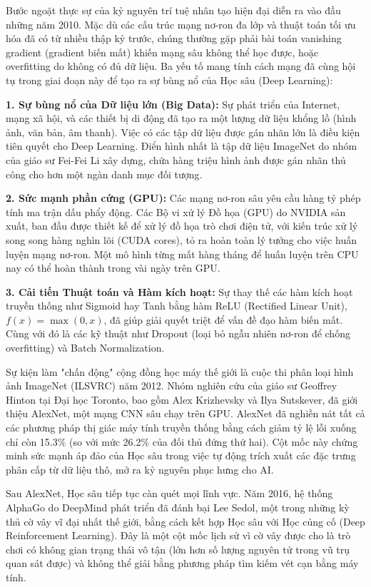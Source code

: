Bước ngoặt thực sự của kỷ nguyên trí tuệ nhân tạo hiện đại diễn ra vào đầu những năm 2010. Mặc dù các cấu trúc mạng nơ-ron đa lớp và thuật toán tối ưu hóa đã có từ nhiều thập kỷ trước, chúng thường gặp phải bài toán vanishing gradient (gradient biến mất) khiến mạng sâu không thể học được, hoặc overfitting do không có đủ dữ liệu. Ba yếu tố mang tính cách mạng đã cùng hội tụ trong giai đoạn này để tạo ra sự bùng nổ của Học sâu (Deep Learning):

\textbf{1. Sự bùng nổ của Dữ liệu lớn (Big Data):} Sự phát triển của Internet, mạng xã hội, và các thiết bị di động đã tạo ra một lượng dữ liệu khổng lồ (hình ảnh, văn bản, âm thanh). Việc có các tập dữ liệu được gán nhãn lớn là điều kiện tiên quyết cho Deep Learning. Điển hình nhất là tập dữ liệu ImageNet do nhóm của giáo sư Fei-Fei Li xây dựng, chứa hàng triệu hình ảnh được gán nhãn thủ công cho hơn một ngàn danh mục đối tượng.

\textbf{2. Sức mạnh phần cứng (GPU):} Các mạng nơ-ron sâu yêu cầu hàng tỷ phép tính ma trận dấu phẩy động. Các Bộ vi xử lý Đồ họa (GPU) do NVIDIA sản xuất, ban đầu được thiết kế để xử lý đồ họa trò chơi điện tử, với kiến trúc xử lý song song hàng nghìn lõi (CUDA cores), tỏ ra hoàn toàn lý tưởng cho việc huấn luyện mạng nơ-ron. Một mô hình từng mất hàng tháng để huấn luyện trên CPU nay có thể hoàn thành trong vài ngày trên GPU.

\textbf{3. Cải tiến Thuật toán và Hàm kích hoạt:} Sự thay thế các hàm kích hoạt truyền thống như Sigmoid hay Tanh bằng hàm ReLU (Rectified Linear Unit), $f(x) = \max(0, x)$, đã giúp giải quyết triệt để vấn đề đạo hàm biến mất. Cùng với đó là các kỹ thuật như Dropout (loại bỏ ngẫu nhiên nơ-ron để chống overfitting) và Batch Normalization.

Sự kiện làm "chấn động" cộng đồng học máy thế giới là cuộc thi phân loại hình ảnh ImageNet (ILSVRC) năm 2012. Nhóm nghiên cứu của giáo sư Geoffrey Hinton tại Đại học Toronto, bao gồm Alex Krizhevsky và Ilya Sutskever, đã giới thiệu AlexNet, một mạng CNN sâu chạy trên GPU. AlexNet đã nghiền nát tất cả các phương pháp thị giác máy tính truyền thống bằng cách giảm tỷ lệ lỗi xuống chỉ còn 15.3\% (so với mức 26.2\% của đối thủ đứng thứ hai). Cột mốc này chứng minh sức mạnh áp đảo của Học sâu trong việc tự động trích xuất các đặc trưng phân cấp từ dữ liệu thô, mở ra kỷ nguyên phục hưng cho AI.

Sau AlexNet, Học sâu tiếp tục càn quét mọi lĩnh vực. Năm 2016, hệ thống AlphaGo do DeepMind phát triển đã đánh bại Lee Sedol, một trong những kỳ thủ cờ vây vĩ đại nhất thế giới, bằng cách kết hợp Học sâu với Học củng cố (Deep Reinforcement Learning). Đây là một cột mốc lịch sử vì cờ vây được cho là trò chơi có không gian trạng thái vô tận (lớn hơn số lượng nguyên tử trong vũ trụ quan sát được) và không thể giải bằng phương pháp tìm kiếm vét cạn bằng máy tính.

